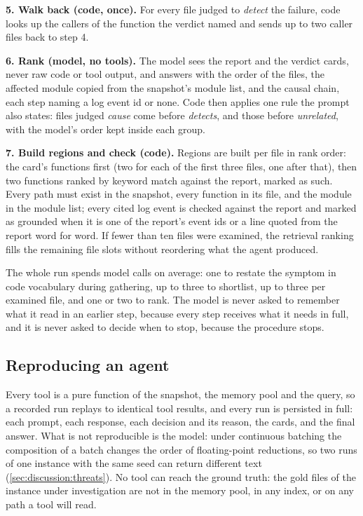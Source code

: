 \textbf{5. Walk back (code, once).} For every file judged to
\emph{detect} the failure, code looks up the callers of the function the
verdict named and sends up to two caller files back to step 4.

\textbf{6. Rank (model, no tools).} The model sees the report and the
verdict cards, never raw code or tool output, and answers with the order
of the files, the affected module copied from the snapshot's module
list, and the causal chain, each step naming a log event id or none.
Code then applies one rule the prompt also states: files judged
\emph{cause} come before \emph{detects}, and those before
\emph{unrelated}, with the model's order kept inside each group.

\textbf{7. Build regions and check (code).} Regions are built per file
in rank order: the card's functions first (two for each of the first
three files, one after that), then two functions ranked by keyword
match against the report, marked as such. Every path must exist in the
snapshot, every function in its file, and the module in the module
list; every cited log event is checked against the report and marked as
grounded when it is one of the report's event ids or a line quoted from
the report word for word.
If fewer than ten files were examined, the retrieval ranking fills the
remaining file slots without reordering what the agent produced.

The whole run spends \calls{} model calls on average: one to restate
the symptom in code vocabulary during gathering, up to three to
shortlist, up to three per examined file, and one or two to rank. The
model is never asked to remember what it read in an earlier step,
because every step receives what it needs in full, and it is never
asked to decide when to stop, because the procedure stops.

\subsection{Reproducing an agent}
\label{sec:agent:repro}

Every tool is a pure function of the snapshot, the memory pool and the
query, so a recorded run replays to identical tool results, and every
run is persisted in full: each prompt, each response, each decision and
its reason, the cards, and the final answer. What is not reproducible is
the model: under continuous batching the composition of a batch changes
the order of floating-point reductions, so two runs of one instance with
the same seed can return different text (\cref{sec:discussion:threats}).
No tool can reach the ground truth: the
gold files of the instance under investigation are not in the memory
pool, in any index, or on any path a tool will read.
